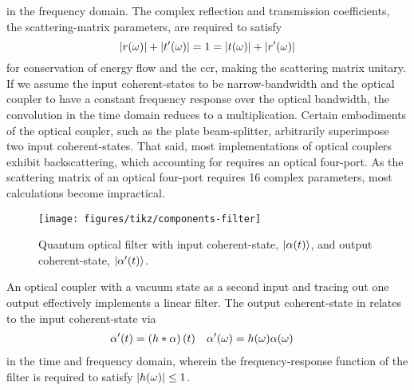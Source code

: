 in the frequency domain.
The complex reflection and transmission coefficients, the scattering-matrix parameters, are required to satisfy
\begin{equation}
	\lvert r(\omega)\rvert
	+
	\lvert t^\prime(\omega)\rvert
	=
	1
	=
	\lvert t(\omega)\rvert
	+
	\lvert r^\prime(\omega)\rvert
\end{equation}
for conservation of energy flow and the \gls{ccr}, making the scattering matrix unitary.
If we assume the input coherent-states to be narrow-bandwidth and the optical coupler to have a constant frequency response over the optical bandwidth, the convolution in the time domain reduces to a multiplication.
Certain embodiments of the optical coupler, such as the plate beam-splitter, arbitrarily superimpose two input coherent-states.
That said, most implementations of optical couplers exhibit backscattering, which accounting for requires an optical four-port.
As the scattering matrix of an optical four-port requires \num{16} complex parameters, most calculations become impractical.
\begin{figure}[htb]
    \centering
    \texttt{[image: figures/tikz/components-filter]}
    \caption{Quantum optical filter with input coherent-state, $\lvert\alpha(t)\rangle$, and output coherent-state, $\lvert\alpha^\prime(t)\rangle$.}\label{fig:components_filter}
\end{figure}
An optical coupler with a vacuum state as a second input and tracing out one output effectively implements a linear filter.
The output coherent-state in  relates to the input coherent-state via
\begin{align*}
	\alpha^\prime(t)
	&=
	\left(h\ast\alpha\right)(t)
	&
	\alpha^\prime(\omega)
	&=
	h(\omega)
	\alpha(\omega)
\end{align*}
in the time and frequency domain, wherein the frequency-response function of the filter is required to satisfy $\lvert h(\omega)\rvert\leq1$.

